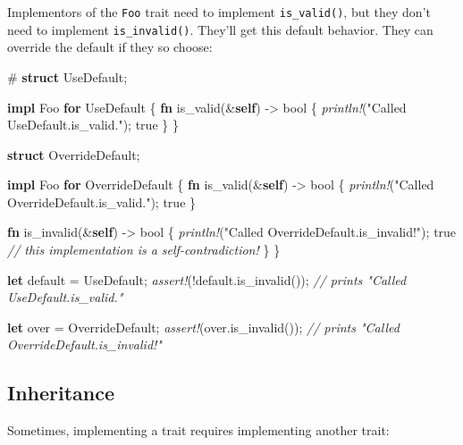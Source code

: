 \documentclass[a4paper,]{book}
\newenvironment{Shaded}{\begin{snugshade}}{\end{snugshade}}
\newcommand{\KeywordTok}[1]{\textcolor[rgb]{0.13,0.29,0.53}{\textbf{{#1}}}}
\newcommand{\DataTypeTok}[1]{\textcolor[rgb]{0.13,0.29,0.53}{{#1}}}
\newcommand{\ConstantTok}[1]{\textcolor[rgb]{0.00,0.00,0.00}{{#1}}}
\newcommand{\StringTok}[1]{\textcolor[rgb]{0.31,0.60,0.02}{{#1}}}
\newcommand{\CommentTok}[1]{\textcolor[rgb]{0.56,0.35,0.01}{\textit{{#1}}}}
\newcommand{\PreprocessorTok}[1]{\textcolor[rgb]{0.56,0.35,0.01}{\textit{{#1}}}}
\newcommand{\NormalTok}[1]{{#1}}
\begin{document}
Implementors of the \texttt{Foo} trait need to implement
\texttt{is\_valid()}, but they don't need to implement
\texttt{is\_invalid()}. They'll get this default behavior. They can
override the default if they so choose:

\begin{Shaded}
\begin{Highlighting}[]
\NormalTok{#}
\KeywordTok{struct} \NormalTok{UseDefault;}

\KeywordTok{impl} \NormalTok{Foo }\KeywordTok{for} \NormalTok{UseDefault \{}
    \KeywordTok{fn} \NormalTok{is_valid(&}\KeywordTok{self}\NormalTok{) -> }\DataTypeTok{bool} \NormalTok{\{}
        \PreprocessorTok{println!}\NormalTok{(}\StringTok{"Called UseDefault.is_valid."}\NormalTok{);}
        \ConstantTok{true}
    \NormalTok{\}}
\NormalTok{\}}

\KeywordTok{struct} \NormalTok{OverrideDefault;}

\KeywordTok{impl} \NormalTok{Foo }\KeywordTok{for} \NormalTok{OverrideDefault \{}
    \KeywordTok{fn} \NormalTok{is_valid(&}\KeywordTok{self}\NormalTok{) -> }\DataTypeTok{bool} \NormalTok{\{}
        \PreprocessorTok{println!}\NormalTok{(}\StringTok{"Called OverrideDefault.is_valid."}\NormalTok{);}
        \ConstantTok{true}
    \NormalTok{\}}

    \KeywordTok{fn} \NormalTok{is_invalid(&}\KeywordTok{self}\NormalTok{) -> }\DataTypeTok{bool} \NormalTok{\{}
        \PreprocessorTok{println!}\NormalTok{(}\StringTok{"Called OverrideDefault.is_invalid!"}\NormalTok{);}
        \ConstantTok{true} \CommentTok{// this implementation is a self-contradiction!}
    \NormalTok{\}}
\NormalTok{\}}

\KeywordTok{let} \NormalTok{default = UseDefault;}
\PreprocessorTok{assert!}\NormalTok{(!default.is_invalid()); }\CommentTok{// prints "Called UseDefault.is_valid."}

\KeywordTok{let} \NormalTok{over = OverrideDefault;}
\PreprocessorTok{assert!}\NormalTok{(over.is_invalid()); }\CommentTok{// prints "Called OverrideDefault.is_invalid!"}
\end{Highlighting}
\end{Shaded}

\subsection{Inheritance}\label{inheritance}

Sometimes, implementing a trait requires implementing another trait:
\end{document}
